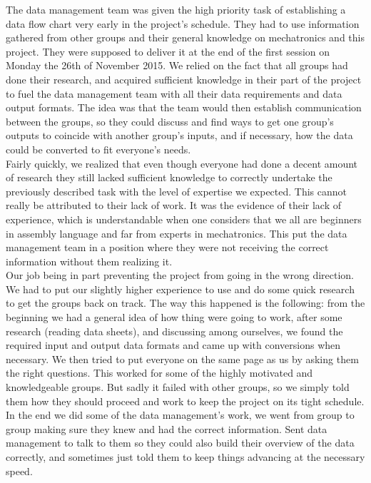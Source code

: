 \documentclass[12pt]{article}
\begin{document}
	The data management team was given the high priority task of establishing a data flow chart very early in the project’s schedule. They had to use information gathered from other groups and their general knowledge on mechatronics and this project. They were supposed to deliver it at the end of the first session on Monday the 26th of November 2015. We relied on the fact that all groups had done their research, and acquired sufficient knowledge in their part of the project to fuel the data management team with all their data requirements and data output formats. The idea was that the team would then establish communication between the groups, so they could discuss and find ways to get one group’s outputs to coincide with another group’s inputs, and if necessary, how the data could be converted to fit everyone’s needs.\\

	Fairly quickly, we realized that even though everyone had done a decent amount of research they still lacked sufficient knowledge to correctly undertake the previously described task with the level of expertise we expected. This cannot really be attributed to their lack of work. It was the evidence of their lack of experience, which is understandable when one considers that we all are beginners in assembly language and far from experts in mechatronics. This put the data management team in a position where they were not receiving the correct information without them realizing it.\\

	Our job being in part preventing the project from going in the wrong direction. We had to put our slightly higher experience to use and do some quick research to get the groups back on track. The way this happened is the following: from the beginning we had a general idea of how thing were going to work, after some research (reading data sheets), and discussing among ourselves, we found the required input and output data formats and came up with conversions when necessary. We then tried to put everyone on the same page as us by asking them the right questions. This worked for some of the highly motivated and knowledgeable groups. But sadly it failed with other groups, so we simply told them how they should proceed and work to keep the project on its tight schedule.\\

	In the end we did some of the data management’s work, we went from group to group making sure they knew and had the correct information. Sent data management to talk to them so they could also build their overview of the data correctly, and sometimes just told them to keep things advancing at the necessary speed.\\
\end{document}
